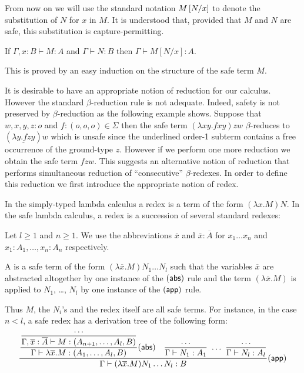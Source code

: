 From now on we will use the standard notation $M\left[ N/x \right]$ to
denote the substitution of $N$ for $x$ in $M$.  It is understood that,
provided that $M$ and $N$ are safe, this substitution is
capture-permitting.


\begin{lemma}
\label{lem:subst_preserve_safety}
If $\Gamma, x :B \vdash M : A$ and $\Gamma \vdash N : B$ then $\Gamma \vdash M[N/x] : A$.
\end{lemma}
This is proved by an easy induction on the structure of the safe term $M$.


It is desirable to have an appropriate notion of reduction for our
calculus. However the standard $\beta$-reduction rule is not
adequate. Indeed, safety is not preserved by $\beta$-reduction as the
following example shows. Suppose that $w,x,y,z : o$ and $f : (o,o,o)
\in \Sigma$ then the safe term $(\lambda x y . f x y) z w$
$\beta$-reduces to $(\underline{\lambda y . f z y}) w$ which is unsafe
since the underlined order-1 subterm contains a free occurrence of the
ground-type $z$. However if we perform one more reduction we obtain
the safe term $f z w$. This suggests an alternative notion of
reduction that performs simultaneous reduction of ``consecutive''
$\beta$-redexes. In order to define this reduction we first introduce
the appropriate notion of redex.

In the simply-typed lambda calculus a redex is a term of the form
$(\lambda x . M) N$. In the safe lambda calculus, a redex is a
succession of several standard redexes:

\begin{definition}\rm
Let $l\geq 1$ and $n\geq 1$. We use the abbreviations $\overline{x}$ and $\overline{x}:\overline{A}$  for $x_1 \ldots x_n$ and $x_1:A_1, \ldots, x_n : A_n$ respectively.

A  is a safe term of the form $(\lambda
\overline{x} . M) N_1 \ldots N_l$ such that the variables
$\overline{x}$ are abstracted altogether by one instance of the
$(\sf{abs})$ rule and the term $(\lambda \overline{x} . M)$ is
applied to $N_1$, \ldots, $N_l$ by one instance of the $(\sf{app})$ rule.
\end{definition}
Thus $M$, the $N_i$'s and the redex itself are all safe terms.
For instance, in the case $n<l$, a safe redex has a derivation tree of the following  form:
$$   \frac{\displaystyle 
            \frac{\displaystyle \frac{\displaystyle \ldots}{\displaystyle \Gamma, \overline{x}:\overline{A} \vdash M : (A_{n+1}, \ldots, A_l, B)}}{\displaystyle \Gamma \vdash \lambda \overline{x} . M : (A_1, \ldots, A_l, B)} ({\sf abs })
            \quad
            \frac{\displaystyle \ldots}{\displaystyle \Gamma \vdash N_1 :A_1}  \ \ldots \  \frac{\displaystyle \ldots}{\displaystyle \Gamma \vdash N_l :A_l}
    }{\displaystyle 
       \Gamma \vdash (\lambda \overline{x} . M) N_1 \ldots N_l : B
    } ({\sf app})
$$


